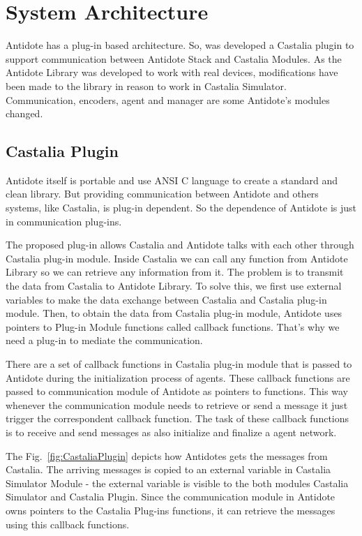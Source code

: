 \section{System Architecture}

Antidote has a plug-in based architecture. So, was developed a Castalia plugin to support communication between Antidote Stack and Castalia Modules. As the Antidote Library was developed to work with real devices, modifications have been made to the library in reason to work in Castalia Simulator. Communication, encoders, agent and manager are some Antidote's modules changed.

\subsection{Castalia Plugin}

Antidote itself is portable and use ANSI C language to create a standard and clean library. But providing communication between Antidote and others systems, like Castalia, is plug-in dependent. So the dependence of Antidote is just in communication plug-ins.

The proposed plug-in allows Castalia and Antidote talks with each other through Castalia plug-in module. Inside Castalia we can call any function from Antidote Library so we can retrieve any information from it. The problem is to transmit the data from Castalia to Antidote Library. To solve this, we first use external variables to make the data exchange between Castalia and Castalia plug-in module. Then, to obtain the data from Castalia plug-in module, Antidote uses pointers to Plug-in Module functions called callback functions. That's why we need a plug-in to mediate the communication. 

There are a set of callback functions in Castalia plug-in module that is passed to Antidote during the initialization process of agents. These callback functions are passed to communication module of Antidote as pointers to functions. This way whenever the communication module needs to retrieve or send a message it just trigger the correspondent callback function. The task of these callback functions is to receive and send messages as also initialize and finalize a agent network.

The Fig.~\ref{fig:CastaliaPlugin} depicts how Antidotes gets the messages from Castalia. The arriving messages is copied to an external variable in Castalia Simulator Module - the external variable is visible to the both modules Castalia Simulator and Castalia Plugin. Since the communication module in Antidote owns pointers to the Castalia Plug-ins functions, it can retrieve the messages using this callback functions.

